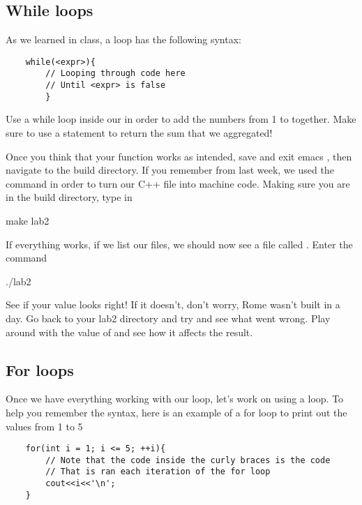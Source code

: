 \documentclass{tufte-handout}
\begin{document}
\subsection{While loops}
As we learned in class, a   loop has the following syntax:
\begin{verbatim}
    while(<expr>){
        // Looping through code here
        // Until <expr> is false
        }
\end{verbatim}


Use a while loop inside our  in order to add the numbers from 1 to  together.  
Make sure to use a  statement to return the sum that we aggregated!

Once you think that your function works as intended, save and exit emacs , then navigate to the build directory. If you remember from last week, we used the  command in order to turn our C++ file into machine code.  Making sure you are in the build directory, type in 
\begin{CmdLine}
  \prompt make lab2
\end{CmdLine}
If everything works, if we list our files, we should now see a file called .  Enter the command
\begin{CmdLine}
  \prompt ./lab2
\end{CmdLine}
See if your value looks right!  If it doesn't, don't worry, Rome wasn't built in a day.  Go back to your lab2 directory and try and see what went wrong.    Play around with the value of  and see how it affects the result.

\subsection{For loops}


Once we have everything working with our  loop, let's work on using a  loop.  To help you remember the syntax, here is an example of a for loop to print out the values from 1 to 5

\begin{verbatim}
    for(int i = 1; i <= 5; ++i){
        // Note that the code inside the curly braces is the code
        // That is ran each iteration of the for loop
        cout<<i<<'\n';
    }
\end{verbatim}
\end{document}
